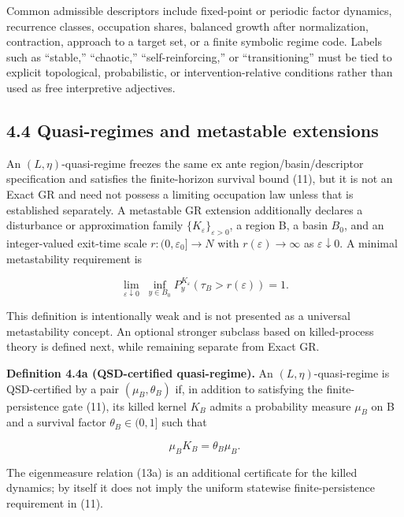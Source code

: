 \documentclass[10pt]{article}
\begin{document}
Common admissible descriptors include fixed-point or periodic factor
dynamics, recurrence classes, occupation shares, balanced growth after
normalization, contraction, approach to a target set, or a finite
symbolic regime code. Labels such as ``stable,'' ``chaotic,''
``self-reinforcing,'' or ``transitioning'' must be tied to explicit
topological, probabilistic, or intervention-relative conditions rather
than used as free interpretive adjectives.

\subsection{4.4 Quasi-regimes and metastable
extensions}\label{quasi-regimes-and-metastable-extensions}

An \((L,\eta)\)-quasi-regime freezes the same ex ante
region/basin/descriptor specification and satisfies the finite-horizon
survival bound (11), but it is not an Exact GR and need not possess a
limiting occupation law unless that is established separately. A
metastable GR extension additionally declares a disturbance or
approximation family \(\{K_\varepsilon\}_{\varepsilon>0}\), a region B,
a basin \(B_0\), and an integer-valued exit-time scale
\(r:(0,\varepsilon_0]\to{}N\) with \(r(\varepsilon)\to{}\infty\) as
\(\varepsilon\downarrow0\). A minimal metastability requirement is

\begin{equation}
\lim_{\varepsilon\downarrow 0}\;\inf_{y\in B_0}P_y^{K_\varepsilon}\!\left(\tau_B>r(\varepsilon)\right)=1.
\tag{13}\label{eq:13}
\end{equation}

This definition is intentionally weak and is not presented as a universal metastability concept. An optional stronger subclass based on killed-process theory is defined next, while remaining separate from Exact GR.

\textbf{Definition 4.4a (QSD-certified quasi-regime).} An \((L,\eta)\)-quasi-regime is QSD-certified by a pair \((\mu_B,\theta_B)\) if, in addition to satisfying the finite-persistence gate (11), its killed kernel \(K_B\) admits a probability measure \(\mu_B\) on B and a survival factor \(\theta_B\in(0,1]\) such that

\begin{equation}
\mu_B K_B=\theta_B\mu_B.
\tag{13a}\label{eq:13a}
\end{equation}

The eigenmeasure relation (13a) is an additional certificate for the killed dynamics; by itself it does not imply the uniform statewise finite-persistence requirement in (11).
\end{document}
